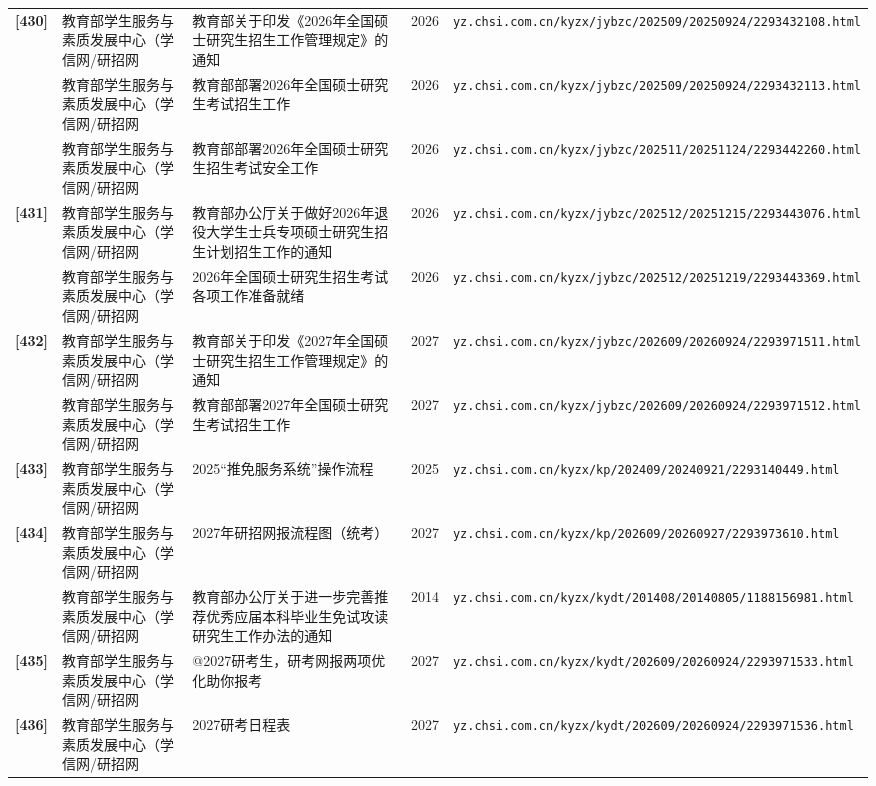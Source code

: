 {\begin{longtable}{@{}p{1.15cm}p{2.9cm}p{6.3cm}p{0.85cm}p{5.0cm}@{}}
\textbf{[430]} & 教育部学生服务与素质发展中心（学信网/研招网 & 教育部关于印发《2026年全国硕士研究生招生工作管理规定》的通知 & 2026 & \texttt{yz.chsi.com.cn/kyzx/jybzc/202509/20250924/2293432108.html} \\
[0] & 教育部学生服务与素质发展中心（学信网/研招网 & 教育部部署2026年全国硕士研究生考试招生工作 & 2026 & \texttt{yz.chsi.com.cn/kyzx/jybzc/202509/20250924/2293432113.html} \\
[0] & 教育部学生服务与素质发展中心（学信网/研招网 & 教育部部署2026年全国硕士研究生招生考试安全工作 & 2026 & \texttt{yz.chsi.com.cn/kyzx/jybzc/202511/20251124/2293442260.html} \\
\textbf{[431]} & 教育部学生服务与素质发展中心（学信网/研招网 & 教育部办公厅关于做好2026年退役大学生士兵专项硕士研究生招生计划招生工作的通知 & 2026 & \texttt{yz.chsi.com.cn/kyzx/jybzc/202512/20251215/2293443076.html} \\
[0] & 教育部学生服务与素质发展中心（学信网/研招网 & 2026年全国硕士研究生招生考试各项工作准备就绪 & 2026 & \texttt{yz.chsi.com.cn/kyzx/jybzc/202512/20251219/2293443369.html} \\
\textbf{[432]} & 教育部学生服务与素质发展中心（学信网/研招网 & 教育部关于印发《2027年全国硕士研究生招生工作管理规定》的通知 & 2027 & \texttt{yz.chsi.com.cn/kyzx/jybzc/202609/20260924/2293971511.html} \\
[0] & 教育部学生服务与素质发展中心（学信网/研招网 & 教育部部署2027年全国硕士研究生考试招生工作 & 2027 & \texttt{yz.chsi.com.cn/kyzx/jybzc/202609/20260924/2293971512.html} \\
\textbf{[433]} & 教育部学生服务与素质发展中心（学信网/研招网 & 2025“推免服务系统”操作流程 & 2025 & \texttt{yz.chsi.com.cn/kyzx/kp/202409/20240921/2293140449.html} \\
\textbf{[434]} & 教育部学生服务与素质发展中心（学信网/研招网 & 2027年研招网报流程图（统考） & 2027 & \texttt{yz.chsi.com.cn/kyzx/kp/202609/20260927/2293973610.html} \\
[0] & 教育部学生服务与素质发展中心（学信网/研招网 & 教育部办公厅关于进一步完善推荐优秀应届本科毕业生免试攻读研究生工作办法的通知 & 2014 & \texttt{yz.chsi.com.cn/kyzx/kydt/201408/20140805/1188156981.html} \\
\textbf{[435]} & 教育部学生服务与素质发展中心（学信网/研招网 & @2027研考生，研考网报两项优化助你报考 & 2027 & \texttt{yz.chsi.com.cn/kyzx/kydt/202609/20260924/2293971533.html} \\
\textbf{[436]} & 教育部学生服务与素质发展中心（学信网/研招网 & 2027研考日程表 & 2027 & \texttt{yz.chsi.com.cn/kyzx/kydt/202609/20260924/2293971536.html} \\

\end{longtable}}
